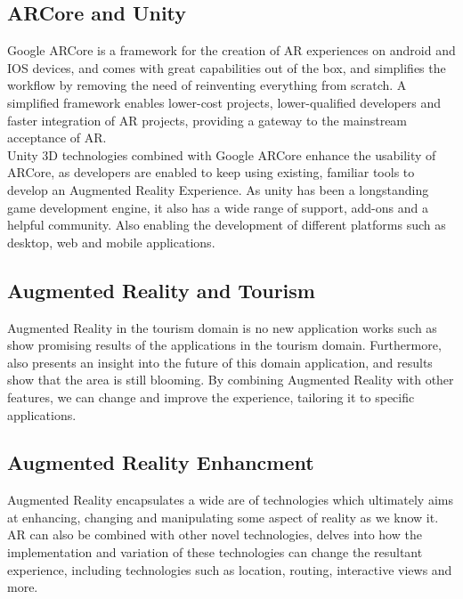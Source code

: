 
\subsection{ARCore and Unity}
Google ARCore is a framework for the creation of AR experiences on android and IOS devices, and comes with great capabilities out of the box, and simplifies the workflow 
by removing the need of reinventing everything from scratch. 
A simplified framework enables lower-cost projects\cite{Huang2019}, lower-qualified developers and faster integration of AR projects, 
providing a gateway to the mainstream acceptance of AR.\\
Unity 3D technologies combined with Google ARCore enhance the usability of ARCore, as developers are enabled to keep using existing, 
familiar tools to develop an Augmented Reality Experience. As unity has been a longstanding game development engine, it also has a wide range of support, 
add-ons and a helpful community. Also enabling the development of different platforms such as desktop, web and mobile applications\cite{Greene2018}.
\subsection{Augmented Reality and Tourism}
Augmented Reality in the tourism domain is no new application works such as \cite{OZKUL2019} show promising results of the applications in the tourism domain.
Furthermore, \cite{JingenLiang2021} also presents an insight into the future of this domain application, and results show that the area is still blooming.
By combining Augmented Reality with other features, we can change and improve the experience, tailoring it to specific applications. 

\subsection{Augmented Reality Enhancment}
Augmented Reality encapsulates a wide are of technologies which ultimately aims at enhancing, changing and manipulating some aspect of reality as we know it. AR can also be combined with other novel technologies, 
\cite{Keckes2017} delves into how the implementation and variation of these technologies can change the resultant experience, including technologies such as location, routing, interactive views and more. 

